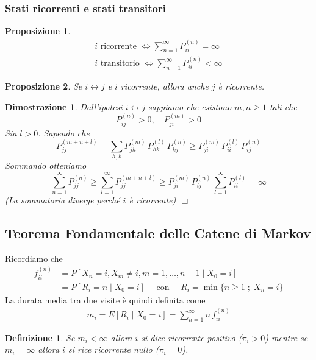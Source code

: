 \documentclass{article}
\newtheorem{definizione}{Definizione}[section]
\newtheorem{proposizione}{Proposizione}[section]
\newtheorem*{dimostrazione*}{Dimostrazione}
\newcommand*{\QED}{\hfill\ensuremath{\Box}}
\begin{document}
\subsubsection{Stati ricorrenti e stati transitori}

\begin{proposizione}
\begin{gather*}
i \text{ ricorrente } \Leftrightarrow \sum_{n=1}^{\infty} P_{ii}^{(n)} = \infty\\
i \text{ transitorio } \Leftrightarrow \sum_{n=1}^{\infty} P_{ii}^{(n)} < \infty
\end{gather*}
\end{proposizione}

\begin{proposizione}
\label{mc_i_comm_j_ricor}
Se $i \leftrightarrow j$ e $i$ ricorrente, allora anche $j$ è ricorrente.
\end{proposizione}
\begin{dimostrazione*}
Dall'ipotesi $i \leftrightarrow j$ sappiamo che esistono $m, n \ge 1$ tali che
$$
P_{ij}^{(n)} > 0,\quad P_{ji}^{(m)} > 0
$$
Sia $l > 0$. Sapendo che
$$
P_{jj}^{(m+n+l)} = \sum_{h,k} P_{jh}^{(m)}\,P_{hk}^{(l)}\,P_{kj}^{(n)} \ge P_{ji}^{(m)}\,P_{ii}^{(l)}\,P_{ij}^{(n)} 
$$
Sommando otteniamo
$$
\sum_{n=1}^{\infty} P_{jj}^{(n)} \ge \sum_{l =1}^{\infty} P_{jj}^{(m+n+l)} \ge P_{ji}^{(m)}\,P_{ij}^{(n)}\,\sum_{l=1}^{\infty} P_{ii}^{(l)} = \infty
$$
(La sommatoria diverge perché $i$ è ricorrente)
\QED
\end{dimostrazione*}

\subsection{Teorema Fondamentale delle Catene di Markov}

Ricordiamo che
\begin{align*}
f_{ii}^{(n)} &= P[X_n = i, X_m \neq i, m = 1,\hdots,n-1 \mid X_0 = i]\\
&= P[R_i = n \mid X_0 = i] \quad \text{ con } \quad R_i = \min\{n \ge 1\;;\; X_n = i\}
\end{align*}
La durata media tra due visite è quindi definita come
\begin{gather}
m_i = E[R_i \mid X_0 = i] = \sum_{n = 1}^{\infty} n \, f_{ii}^{(n)}
\end{gather}
\begin{definizione}
Se $m_i < \infty$ allora $i$ si dice \emph{ricorrente positivo} ($\pi_i > 0$) mentre se $m_i = \infty$ allora $i$ si rice \emph{ricorrente nullo} ($\pi_i = 0$). 
\end{definizione}
\end{document}
